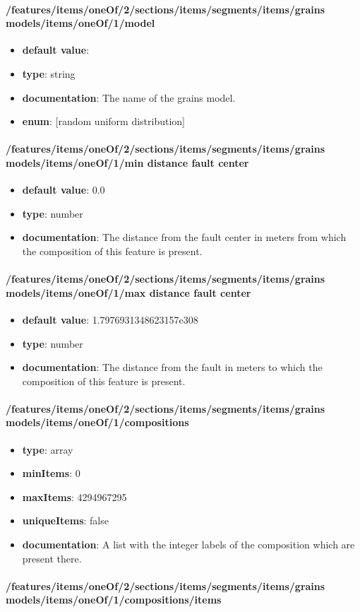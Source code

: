 \paragraph{/features/items/oneOf/2/sections/items/segments/items/grains models/items/oneOf/1/model}
\begin{itemize}\item {\bf default value}: 
\item {\bf type}: string
\item {\bf documentation}: The name of the grains model.
\item {\bf enum}: [random uniform distribution]\end{itemize}\paragraph{/features/items/oneOf/2/sections/items/segments/items/grains models/items/oneOf/1/min distance fault center}
\begin{itemize}\item {\bf default value}: 0.0
\item {\bf type}: number
\item {\bf documentation}: The distance from the fault center in meters from which the composition of this feature is present.
\end{itemize}\paragraph{/features/items/oneOf/2/sections/items/segments/items/grains models/items/oneOf/1/max distance fault center}
\begin{itemize}\item {\bf default value}: 1.7976931348623157e308
\item {\bf type}: number
\item {\bf documentation}: The distance from the fault in meters to which the composition of this feature is present.
\end{itemize}\paragraph{/features/items/oneOf/2/sections/items/segments/items/grains models/items/oneOf/1/compositions}
\begin{itemize}\item {\bf type}: array
\item {\bf minItems}: 0
\item {\bf maxItems}: 4294967295
\item {\bf uniqueItems}: false
\item {\bf documentation}: A list with the integer labels of the composition which are present there.
\end{itemize}\paragraph{/features/items/oneOf/2/sections/items/segments/items/grains models/items/oneOf/1/compositions/items}
